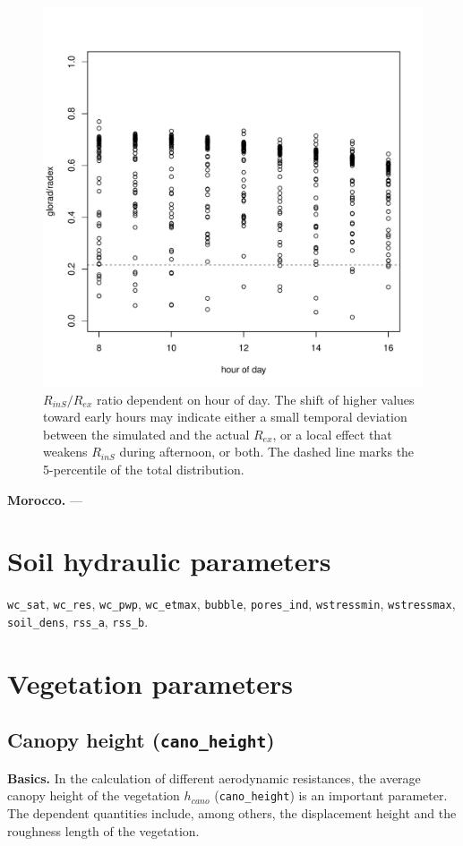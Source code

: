 \documentclass{scrreprt}
\begin{document}
\begin{figure}[ht]
  \centering
  \includegraphics[width=0.6\hsize]{./plot_radex2.pdf}
  \caption{$R_{inS}/R_{ex}$ ratio dependent on hour of day.
           The shift of higher values toward early hours may indicate either a small temporal deviation between the simulated and the actual $R_{ex}$, or a local effect that weakens $R_{inS}$ during afternoon, or both.
           The dashed line marks the 5-percentile of the total distribution.}
  \label{fig:portugal_radex2}
\end{figure}

\textbf{Morocco.}
---

\section{Soil hydraulic parameters} \label{sec:parest_soil}

\verb!wc_sat!, \verb!wc_res!, \verb!wc_pwp!, \verb!wc_etmax!, \verb!bubble!, \verb!pores_ind!, \verb!wstressmin!, \verb!wstressmax!, \verb!soil_dens!, \verb!rss_a!, \verb!rss_b!.

\section{Vegetation parameters} \label{sec:parest_veg}

\subsection{Canopy height (\texttt{cano\_height})} \label{ssec:parest_veg_canoheight}

\textbf{Basics.}
In the calculation of different aerodynamic resistances, the average canopy height of the vegetation $h_{cano}$ (\verb!cano_height!) is an important parameter.
The dependent quantities include, among others, the displacement height and the roughness length of the vegetation.
\end{document}
